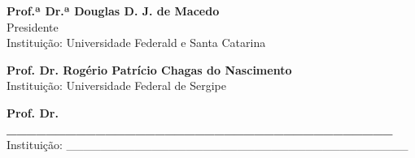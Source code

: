 \documentclass[
	12pt,				%
	oneside,			%
	a4paper,			%
	english,			%
	brazil				%
	]{abntex2ppgsi}
\begin{document}
\begin{folhadeaprovacao}
\begin{center}
%
% 
% 
%
% 
% 
% 
%
%
\textbf{Prof.ª Dr.ª Douglas D. J. de Macedo} 
\\ Presidente 
\\ Instituição: Universidade Federald e Santa Catarina 

\vspace*{2cm}

\textbf{Prof. Dr. Rogério Patrício Chagas do Nascimento} 
\\ Instituição: Universidade Federal de Sergipe

\vspace*{2cm}

\textbf{Prof. Dr. \_\_\_\_\_\_\_\_\_\_\_\_\_\_\_\_\_\_\_\_\_\_\_\_\_\_\_\_\_\_\_\_\_\_\_\_\_\_\_} 
\\ Instituição: \_\_\_\_\_\_\_\_\_\_\_\_\_\_\_\_\_\_\_\_\_\_\_\_\_\_\_\_\_\_\_\_\_\_\_\_\_\_\_\_

\end{center}
  
\end{folhadeaprovacao}

%
% 
\end{document}
